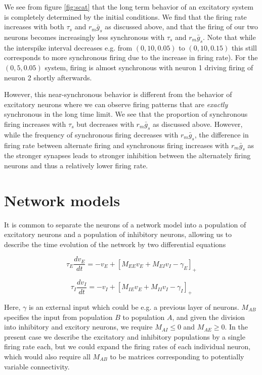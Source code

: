 \documentclass{article}
\begin{document}
We see from figure  \ref{fig:scat} that the long term behavior of an excitatory system is completely determined by the initial conditions. We find that the firing rate increases with both $\tau_s$ and $r_m \bar g_s$ as discussed above, and that the firing of our two neurons becomes increasingly less synchronous with $\tau_s$ and $r_m \bar g_s$. Note that while the interspike interval decreases e.g. from $(0,10,0.05)$ to $(0,10,0.15)$ this still corresponds to more synchronous firing due to the increase in firing rate). For the $(0,5,0.05)$ system, firing is almost synchronous with neuron 1 driving firing of neuron 2 shortly afterwards.

However, this near-synchronous behavior is different from the behavior of excitatory neurons where we can observe firing patterns that are \textit{exactly} synchronous in the long time limit. We see that the proportion of synchronous firing increases with $\tau_s$ but decreases with $r_m \bar g_s$ as discussed above. However, while the frequency of synchronous firing decreases with $r_m \bar g_s$, the difference in firing rate between alternate firing and synchronous firing increases with $r_m \bar g_s$ as the stronger synapses leads to stronger inhibition between the alternately firing neurons and thus a relatively lower firing rate.


\section{Network models}

It is common to separate the neurons of a network model into a population of excitatory neurons and a population of inhibitory neurons, allowing us to describe the time evolution of the network by two differential equations

\begin{equation}
\tau_E \dfrac{dv_E}{dt} = -v_E + [M_{EE}v_E+M_{EI}v_I-\gamma_E]_+
\end{equation}

\begin{equation}
\tau_I \dfrac{dv_I}{dt} = -v_I + [M_{IE}v_E+M_{II}v_I-\gamma_I]_+
\end{equation}

Here, $\gamma$ is an external input which could be e.g. a previous layer of neurons. $M_{AB}$ specifies the input from population $B$ to population $A$, and given the division into inhibitory and excitory neurons, we require $M_{AI} \leq 0$ and $M_{AE} \geq 0$. In the present case we describe the excitatory and inhibitory populations by a single firing rate each, but we could expand the firing rates of each individual neuron, which would also require all $M_{AB}$ to be matrices corresponding to potentially variable connectivity.
\end{document}
